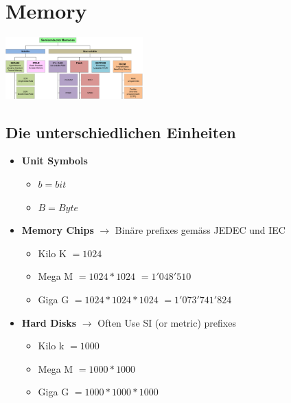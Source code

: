 \documentclass{article}
\newenvironment{Figure}
	{\par\medskip\noindent\minipage{\linewidth}}
	{\endminipage\par\medskip}
\begin{document}
\section{Memory}
\begin{Figure}
\centering
\includegraphics[width=200px]{img/Speicherarten.png}
	\label{fig:Übersicht der einzelnen Speicherarten}
\end{Figure}

\subsection{Die unterschiedlichen Einheiten}
\begin{itemize}
	\item{\textbf{Unit Symbols}
	\begin{itemize}
		\item $b = bit$
		\item $B = Byte$
	\end{itemize}	
	}
	\item{\textbf{Memory Chips} $\rightarrow$ Binäre prefixes gemäss JEDEC und IEC
	\begin{itemize}
		\item Kilo \quad K \quad $= 1024$ 
		\item Mega \quad M \quad $= 1024 * 1024$ \quad $=1'048'510$
		\item Giga \quad G \quad $= 1024 * 1024 * 1024$ \quad $=1'073'741'824$
	\end{itemize}
	}
	\item{\textbf{Hard Disks} $\rightarrow$ Often Use SI (or metric) prefixes
	\begin{itemize}
		\item Kilo \quad k \quad $= 1000$ 
		\item Mega \quad M \quad $= 1000 * 1000$
		\item Giga \quad G \quad $= 1000 * 1000 * 1000$
	\end{itemize}
	}
\end{itemize}
\end{document}
